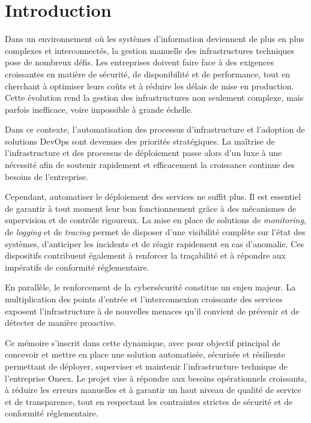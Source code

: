 \section{Introduction}

Dans un environnement où les systèmes d'information deviennent de plus en plus complexes et interconnectés, la gestion manuelle des infrastructures techniques pose de nombreux défis. Les entreprises doivent faire face à des exigences croissantes en matière de sécurité, de disponibilité et de performance, tout en cherchant à optimiser leurs coûts et à réduire les délais de mise en production. Cette évolution rend la gestion des infrastructures non seulement complexe, mais parfois inefficace, voire impossible à grande échelle.

Dans ce contexte, l'automatisation des processus d'infrastructure et l'adoption de solutions DevOps sont devenues des priorités stratégiques. La maîtrise de l'infrastructure et des processus de déploiement passe alors d'un luxe à une nécessité afin de soutenir rapidement et efficacement la croissance continue des besoins de l'entreprise.

Cependant, automatiser le déploiement des services ne suffit plus. Il est essentiel de garantir à tout moment leur bon fonctionnement grâce à des mécanismes de supervision et de contrôle rigoureux. La mise en place de solutions de \emph{monitoring}, de \emph{logging} et de \emph{tracing} permet de disposer d'une visibilité complète sur l'état des systèmes, d'anticiper les incidents et de réagir rapidement en cas d'anomalie. Ces dispositifs contribuent également à renforcer la traçabilité et à répondre aux impératifs de conformité réglementaire.

En parallèle, le renforcement de la cybersécurité constitue un enjeu majeur. La multiplication des points d'entrée et l'interconnexion croissante des services exposent l'infrastructure à de nouvelles menaces qu'il convient de prévenir et de détecter de manière proactive.

Ce mémoire s'inscrit dans cette dynamique, avec pour objectif principal de concevoir et mettre en place une solution automatisée, sécurisée et résiliente permettant de déployer, superviser et maintenir l'infrastructure technique de l'entreprise Oneex. Le projet vise à répondre aux besoins opérationnels croissants, à réduire les erreurs manuelles et à garantir un haut niveau de qualité de service et de transparence, tout en respectant les contraintes strictes de sécurité et de conformité réglementaire.

